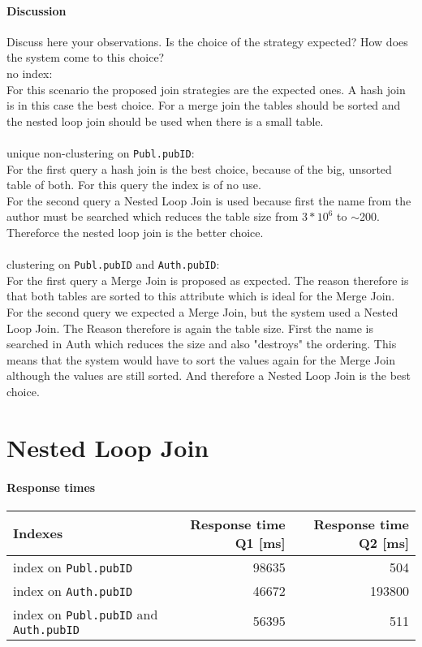\documentclass[11pt]{scrartcl}
\begin{document}
\paragraph{Discussion}
Discuss here your observations. Is the choice of the strategy
expected? How does the system come to this choice?\\
no index:\\
For this scenario the proposed join strategies are the expected ones. A hash join is in this case the best choice. For a merge join the tables should be sorted and the nested loop join should be used when there is a small table.\\
\\
unique non-clustering on {\tt Publ.pubID}:\\
For the first query a hash join is the best choice, because of the big, unsorted table of both. For this query the index is of no use.\\
For the second query a Nested Loop Join is used because first the name from the author must be searched which reduces the table size from $3*10^6$ to $\sim$200. Thereforce the nested loop join is the better choice.\\
\\
clustering on {\tt Publ.pubID} and {\tt Auth.pubID}:\\
For the first query a Merge Join is proposed as expected. The reason therefore is that both tables are sorted to this attribute which is ideal for the Merge Join.\\
For the second query we expected a Merge Join, but the system used a Nested Loop Join. The Reason therefore is again the table size. First the name is searched in Auth which reduces the size and also "destroys" the ordering. This means that the system would have to sort the values again for the Merge Join although the values are still sorted. And therefore a Nested Loop Join is the best choice.


\section{Nested Loop Join}

\paragraph{Response times}

\begin{flushleft}
\begin{tabular}{l|r|r}
  Indexes & Response time Q1 [ms] & Response time Q2 [ms] \\
  \hline
  index on {\tt Publ.pubID} & 98635 & 504  \\
  index on {\tt Auth.pubID} & 46672 & 193800 \\
  index on {\tt Publ.pubID} and {\tt Auth.pubID} & 56395 & 511 \\
\end{tabular}
\end{flushleft}
\end{document}
